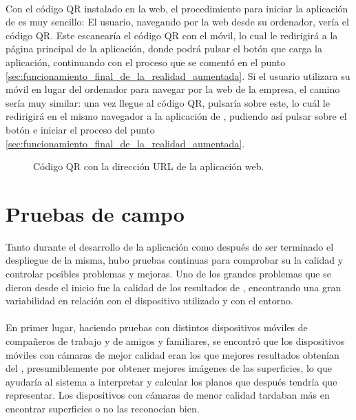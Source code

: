 \documentclass{subfiles}
\begin{document}
    \paragraph{}
    Con el código QR instalado en la web, el procedimiento para iniciar la aplicación de \ra es muy sencillo: El usuario, navegando por la web desde su ordenador, vería el código QR. Este escanearía el código QR con el móvil, lo cual le redirigirá a la página principal de la aplicación, donde podrá pulsar el botón que carga la aplicación, continuando con el proceso que se comentó en el punto \ref{sec:funcionamiento_final_de_la_realidad_aumentada}. Si el usuario utilizara su móvil en lugar del ordenador para navegar por la web de la empresa, el camino sería muy similar: una vez llegue al código QR, pulsaría sobre este, lo cuál le redirigirá en el mismo navegador a la aplicación de \ra, pudiendo así pulsar sobre el botón e iniciar el proceso del punto \ref{sec:funcionamiento_final_de_la_realidad_aumentada}.

    \begin{figure}[H]
    \centering
    \caption{Código QR con la dirección URL de la aplicación web.}
    \label{fig:5.1_qr_actualizado}
    \end{figure}

    \section{Pruebas de campo}
    \label{sec:pruebas_de_campo}
    Tanto durante el desarrollo de la aplicación como después de ser terminado el despliegue de la misma, hubo pruebas continuas para comprobar su la calidad y controlar posibles problemas y mejoras. Uno de los grandes problemas que se dieron desde el inicio fue la calidad de los resultados de \hittest, encontrando una gran variabilidad en relación con el dispositivo utilizado y con el entorno.

    \paragraph{}
    En primer lugar, haciendo pruebas con distintos dispositivos móviles de compañeros de trabajo y de amigos y familiares, se encontró que los dispositivos móviles con cámaras de mejor calidad eran los que mejores resultados obtenían del \hittest, presumiblemente por obtener mejores imágenes de las superficies, lo que ayudaría al sistema a interpretar y calcular los planos que después tendría que representar. Los dispositivos con cámaras de menor calidad tardaban más en encontrar superficies o no las reconocían bien.
\end{document}
